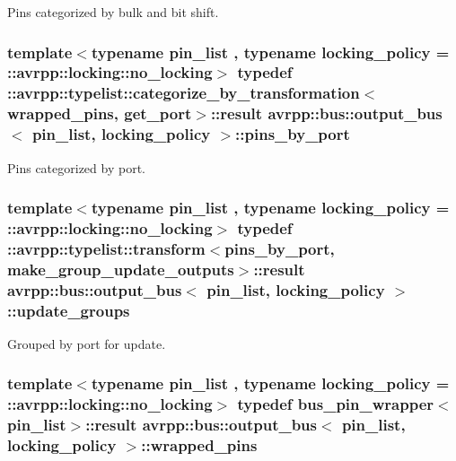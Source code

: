 Pins categorized by bulk and bit shift. 

\hypertarget{structavrpp_1_1bus_1_1output__bus_a799be6ff173156ae47c7f4e8725f790f}{
\subsubsection[{pins\_\-by\_\-port}]{\setlength{\rightskip}{0pt plus 5cm}template$<$typename pin\_\-list , typename locking\_\-policy  = ::avrpp::locking::no\_\-locking$>$ typedef ::avrpp::typelist::categorize\_\-by\_\-transformation$<${\bf wrapped\_\-pins}, {\bf get\_\-port}$>$::result {\bf avrpp::bus::output\_\-bus}$<$ pin\_\-list, locking\_\-policy $>$::{\bf pins\_\-by\_\-port}}}
\label{structavrpp_1_1bus_1_1output__bus_a799be6ff173156ae47c7f4e8725f790f}


Pins categorized by port. 

\hypertarget{structavrpp_1_1bus_1_1output__bus_a11b639509831093295a592576d5fe85a}{
\subsubsection[{update\_\-groups}]{\setlength{\rightskip}{0pt plus 5cm}template$<$typename pin\_\-list , typename locking\_\-policy  = ::avrpp::locking::no\_\-locking$>$ typedef ::avrpp::typelist::transform$<${\bf pins\_\-by\_\-port}, {\bf make\_\-group\_\-update\_\-outputs}$>$::result {\bf avrpp::bus::output\_\-bus}$<$ pin\_\-list, locking\_\-policy $>$::{\bf update\_\-groups}}}
\label{structavrpp_1_1bus_1_1output__bus_a11b639509831093295a592576d5fe85a}


Grouped by port for update. 

\hypertarget{structavrpp_1_1bus_1_1output__bus_a80cbab4a94f1c05bf8e0f133a59a7fbb}{
\subsubsection[{wrapped\_\-pins}]{\setlength{\rightskip}{0pt plus 5cm}template$<$typename pin\_\-list , typename locking\_\-policy  = ::avrpp::locking::no\_\-locking$>$ typedef bus\_\-pin\_\-wrapper$<$pin\_\-list$>$::result {\bf avrpp::bus::output\_\-bus}$<$ pin\_\-list, locking\_\-policy $>$::{\bf wrapped\_\-pins}}}
\label{structavrpp_1_1bus_1_1output__bus_a80cbab4a94f1c05bf8e0f133a59a7fbb}


